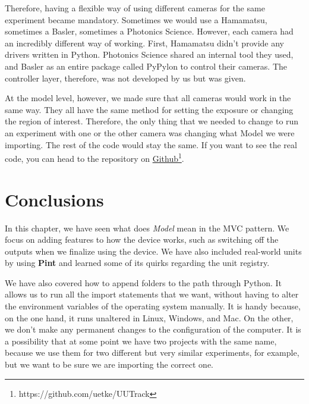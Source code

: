 Therefore, having a flexible way of using different cameras for the same experiment became mandatory. Sometimes we would use a Hamamatsu, sometimes a Basler, sometimes a Photonics Science. However, each camera had an incredibly different way of working. First, Hamamatsu didn't provide any drivers written in Python. Photonics Science shared an internal tool they used, and Basler as an entire package called PyPylon to control their cameras. The controller layer, therefore, was not developed by us but was given.

At the model level, however, we made sure that all cameras would work in the same way. They all have the same method for setting the exposure or changing the region of interest. Therefore, the only thing that we needed to change to run an experiment with one or the other camera was changing what Model we were importing. The rest of the code would stay the same. If you want to see the real code, you can head to the repository on \href{https://github.com/uetke/UUTrack/tree/master/UUTrack/Model/Cameras}{Github}\footnote{https://github.com/uetke/UUTrack}.

\section{Conclusions}\label{sec:device-model-conclusions2}
In this chapter, we have seen what does \emph{Model} mean in the {MVC} pattern. We focus on adding features to how the device works, such as switching off the outputs when we finalize using the device. We have also included real-world units by using \textbf{Pint} and learned some of its quirks regarding the unit registry.

We have also covered how to append folders to the path through Python. It allows us to run all the import statements that we want, without having to alter the environment variables of the operating system manually. It is handy because, on the one hand, it runs unaltered in Linux, Windows, and Mac. On the other, we don't make any permanent changes to the configuration of the computer. It is a possibility that at some point we have two projects with the same name, because we use them for two different but very similar experiments, for example, but we want to be sure we are importing the correct one.
